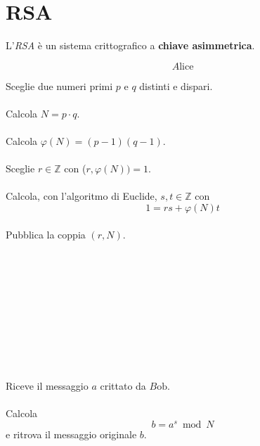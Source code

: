 \documentclass[a4paper,12pt, oneside]{book}
\begin{document}
	\newpage
	\section{RSA}
		L'\textit{RSA} è un sistema crittografico a \textbf{chiave asimmetrica}.\\

		\begin{minipage}{0.45\textwidth}
			
			$$A\mbox{lice}$$\linebreak[2]
			
			Sceglie due numeri primi $p$ e $q$ distinti e dispari.\\\\
			Calcola $N = p \cdot q$.\\\\				
			Calcola $\varphi(N) = (p-1)(q-1)$.\\\\				
			Sceglie $r \in \mathbb{Z}$ con ($r, \varphi(N))=1$.\\\\
			Calcola, con l'algoritmo di Euclide, $s,t \in \mathbb{Z}$ con $$1=rs+\varphi(N)t$$\\
			Pubblica la coppia $(r, N)$.\\\\\\\\\\\\\\\\\\\\\\
			
			Riceve il messaggio $a$ crittato da $B\mbox{ob}$.\\\\
			Calcola $$b = a^s \bmod N$$ e ritrova il messaggio originale $b$.
			
			
		\end{minipage}%
		\hfill
\end{document}
